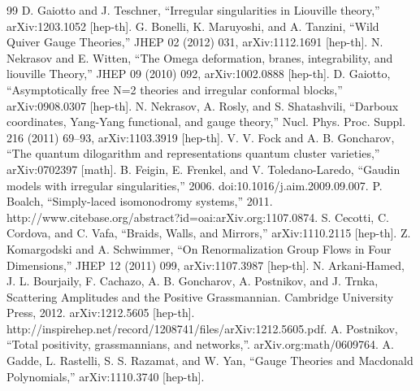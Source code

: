 \begin{thebibliography}{99}
 D. Gaiotto and J. Teschner, “Irregular singularities in Liouville theory,” arXiv:1203.1052 [hep-th].
 G. Bonelli, K. Maruyoshi, and A. Tanzini, “Wild Quiver Gauge Theories,” JHEP 02 (2012) 031, arXiv:1112.1691 [hep-th].
 N. Nekrasov and E. Witten, “The Omega deformation, branes, integrability, and liouville Theory,” JHEP 09 (2010) 092, arXiv:1002.0888 [hep-th].
 D. Gaiotto, “Asymptotically free N=2 theories and irregular conformal blocks,” arXiv:0908.0307 [hep-th].
 N. Nekrasov, A. Rosly, and S. Shatashvili, “Darboux coordinates, Yang-Yang functional, and gauge theory,” Nucl. Phys. Proc. Suppl. 216 (2011) 69–93, arXiv:1103.3919 [hep-th].
 V. V. Fock and A. B. Goncharov, “The quantum dilogarithm and representations quantum cluster varieties,” arXiv:0702397 [math].
 B. Feigin, E. Frenkel, and V. Toledano-Laredo, “Gaudin models with irregular singularities,” 2006. doi:10.1016/j.aim.2009.09.007.
 P. Boalch, “Simply-laced isomonodromy systems,” 2011. http://www.citebase.org/abstract?id=oai:arXiv.org:1107.0874.
 S. Cecotti, C. Cordova, and C. Vafa, “Braids, Walls, and Mirrors,” arXiv:1110.2115 [hep-th].
 Z. Komargodski and A. Schwimmer, “On Renormalization Group Flows in Four Dimensions,” JHEP 12 (2011) 099, arXiv:1107.3987 [hep-th].
 N. Arkani-Hamed, J. L. Bourjaily, F. Cachazo, A. B. Goncharov, A. Postnikov, and J. Trnka, Scattering Amplitudes and the Positive Grassmannian. Cambridge University Press, 2012. arXiv:1212.5605 [hep-th]. http://inspirehep.net/record/1208741/files/arXiv:1212.5605.pdf.
 A. Postnikov, “Total positivity, grassmannians, and networks,”. arXiv.org:math/0609764.
 A. Gadde, L. Rastelli, S. S. Razamat, and W. Yan, “Gauge Theories and Macdonald Polynomials,” arXiv:1110.3740 [hep-th].
\end{thebibliography}
